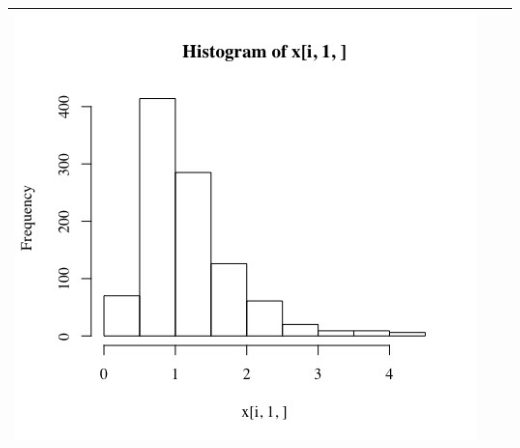 \documentclass[11pt]{article}
\begin{document}
\begin{table}[h]
\begin{center}
\begin{tabular}{| >{\centering\arraybackslash}m{2.1in} |  >{\centering\arraybackslash}m{2.1in} |  >{\centering\arraybackslash}m{2.1in}|}
      \includegraphics[width=1\linewidth,height=0.18\textheight]{plot6-3}\\\hline
    \end{tabular}
  \end{center}
\end{table}






\end{document}
